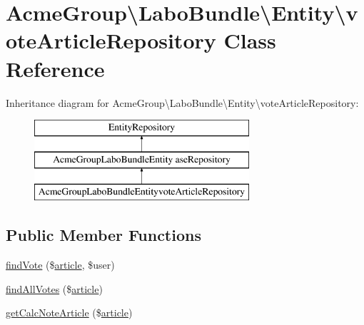 \hypertarget{class_acme_group_1_1_labo_bundle_1_1_entity_1_1vote_article_repository}{\section{Acme\+Group\textbackslash{}Labo\+Bundle\textbackslash{}Entity\textbackslash{}vote\+Article\+Repository Class Reference}
\label{class_acme_group_1_1_labo_bundle_1_1_entity_1_1vote_article_repository}
}
Inheritance diagram for Acme\+Group\textbackslash{}Labo\+Bundle\textbackslash{}Entity\textbackslash{}vote\+Article\+Repository\+:\begin{figure}[H]
\begin{center}
\leavevmode
\includegraphics[height=3.000000cm]{class_acme_group_1_1_labo_bundle_1_1_entity_1_1vote_article_repository}
\end{center}
\end{figure}
\subsection*{Public Member Functions}
\begin{DoxyCompactItemize}
\item 
\hyperlink{class_acme_group_1_1_labo_bundle_1_1_entity_1_1vote_article_repository_a0b789f91e7609234253c48d1a11818f9}{find\+Vote} (\$\hyperlink{class_acme_group_1_1_labo_bundle_1_1_entity_1_1article}{article}, \$user)
\item 
\hyperlink{class_acme_group_1_1_labo_bundle_1_1_entity_1_1vote_article_repository_a85f3a04074dc446cf10bb8c4a4c0d4ac}{find\+All\+Votes} (\$\hyperlink{class_acme_group_1_1_labo_bundle_1_1_entity_1_1article}{article})
\item 
\hyperlink{class_acme_group_1_1_labo_bundle_1_1_entity_1_1vote_article_repository_a32004b1743174f951f66233c491a5a1d}{get\+Calc\+Note\+Article} (\$\hyperlink{class_acme_group_1_1_labo_bundle_1_1_entity_1_1article}{article})
\end{DoxyCompactItemize}
